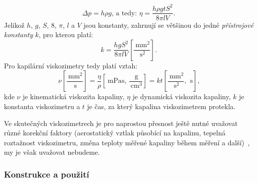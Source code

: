 \documentclass[12pt]{article}
\begin{document}
\begin{equation}
    \Delta p = h\rho g \text{, a tedy: }\eta = \frac{h\rho gtS^2}{8\pi lV}\text{.}
\end{equation}
Jelikož $h$, $g$, $S$, $8$, $\pi$, $l$ a $V$ jsou konstanty, zahrnují se většinou do jedné \emph{přístrojové konstanty} $k$, pro kterou platí:
\begin{equation}
    k = \frac{hgS^2}{8\pi lV}\left[\frac{\SI{}{\milli\metre\squared}}{\SI{}{\second\squared}}\right]\text{.}
\end{equation}
Pro kapilární viskozimetry tedy platí vztah:
\begin{equation}
    \nu\left[\frac{\SI{}{\milli\metre\squared}}{\SI{}{\second}}\right] = \frac{\eta}{\rho}\left[\SI{}{\milli\pascal\second}\text{, } \frac{\SI{}{\gram}}{\SI{}{\centi\meter\cubed}}\right]= kt\left[\frac{\SI{}{\milli\metre\squared}}{\SI{}{\second\squared}}\text{, }\SI{}{\second}\right]\text{,}\label{eq:kapilarni_viskozimetr}
\end{equation}
kde $\nu$ je kinematická viskozita kapaliny, $\eta$ je dynamická viskozita kapaliny, $k$ je konstanta viskozimetru a $t$ je čas, za který kapalina viskozimetrem protekla.
\par
Ve skutečných viskozimetrech je pro naprostou přesnost ještě nutné uvažovat různé korekční faktory (aerostatický vztlak působící na kapalinu, tepelná roztažnost viskozimetru, změna teploty měřené kapaliny během měření a další)~\cite{book:Calibration_of_viscometers}, my je však uvažovat nebudeme.

\subsubsection{Konstrukce a použití}%
\end{document}
